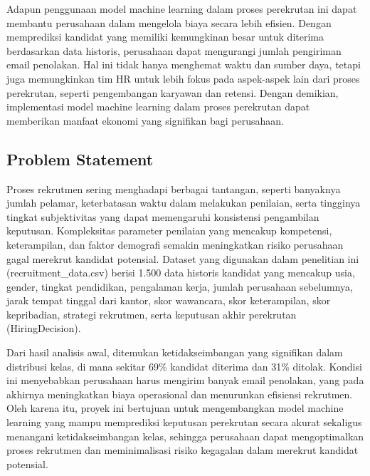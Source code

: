 Adapun penggunaan model machine learning dalam proses perekrutan ini dapat membantu perusahaan dalam mengelola biaya secara lebih efisien. Dengan memprediksi kandidat yang memiliki kemungkinan besar untuk diterima berdasarkan data historis, perusahaan dapat mengurangi jumlah pengiriman email penolakan. Hal ini tidak hanya menghemat waktu dan sumber daya, tetapi juga memungkinkan tim HR untuk lebih fokus pada aspek-aspek lain dari proses perekrutan, seperti pengembangan karyawan dan retensi. Dengan demikian, implementasi model machine learning dalam proses perekrutan dapat memberikan manfaat ekonomi yang signifikan bagi perusahaan.


\subsection{Problem Statement}


Proses rekrutmen sering menghadapi berbagai tantangan, seperti banyaknya jumlah pelamar, keterbatasan waktu dalam melakukan penilaian, serta tingginya tingkat subjektivitas yang dapat memengaruhi konsistensi pengambilan keputusan. Kompleksitas parameter penilaian yang mencakup kompetensi, keterampilan, dan faktor demografi semakin meningkatkan risiko perusahaan gagal merekrut kandidat potensial. Dataset yang digunakan dalam penelitian ini (recruitment\_data.csv) berisi 1.500 data historis kandidat yang mencakup usia, gender, tingkat pendidikan, pengalaman kerja, jumlah perusahaan sebelumnya, jarak tempat tinggal dari kantor, skor wawancara, skor keterampilan, skor kepribadian, strategi rekrutmen, serta keputusan akhir perekrutan (HiringDecision). 

Dari hasil analisis awal, ditemukan ketidakseimbangan yang signifikan dalam distribusi kelas, di mana sekitar 69\%  kandidat diterima dan 31\% ditolak. Kondisi ini menyebabkan perusahaan harus mengirim banyak email penolakan, yang pada akhirnya meningkatkan biaya operasional dan menurunkan efisiensi rekrutmen. Oleh karena itu, proyek ini bertujuan untuk mengembangkan model machine learning yang mampu memprediksi keputusan perekrutan secara akurat sekaligus menangani ketidakseimbangan kelas, sehingga perusahaan dapat mengoptimalkan proses rekrutmen dan meminimalisasi risiko kegagalan dalam merekrut kandidat potensial.


